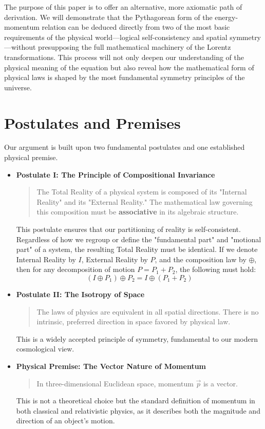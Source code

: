 \documentclass[12pt, a4paper]{article}
\begin{document}
The purpose of this paper is to offer an alternative, more axiomatic path of derivation. We will demonstrate that the Pythagorean form of the energy-momentum relation can be deduced directly from two of the most basic requirements of the physical world—logical self-consistency and spatial symmetry—without presupposing the full mathematical machinery of the Lorentz transformations. This process will not only deepen our understanding of the physical meaning of the equation but also reveal how the mathematical form of physical laws is shaped by the most fundamental symmetry principles of the universe.

\section{Postulates and Premises}

Our argument is built upon two fundamental postulates and one established physical premise.

\begin{itemize}
    \item \textbf{Postulate I: The Principle of Compositional Invariance}
    \begin{quote}
    The Total Reality of a physical system is composed of its "Internal Reality" and its "External Reality." The mathematical law governing this composition must be \textbf{associative} in its algebraic structure.
    \end{quote}
    This postulate ensures that our partitioning of reality is self-consistent. Regardless of how we regroup or define the "fundamental part" and "motional part" of a system, the resulting Total Reality must be identical. If we denote Internal Reality by $I$, External Reality by $P$, and the composition law by $\oplus$, then for any decomposition of motion $P = P_1 + P_2$, the following must hold:
    \begin{equation}
        (I \oplus P_1) \oplus P_2 = I \oplus (P_1 + P_2)
        \label{eq:assoc}
    \end{equation}

    \item \textbf{Postulate II: The Isotropy of Space}
    \begin{quote}
    The laws of physics are equivalent in all spatial directions. There is no intrinsic, preferred direction in space favored by physical law.
    \end{quote}
    This is a widely accepted principle of symmetry, fundamental to our modern cosmological view.

    \item \textbf{Physical Premise: The Vector Nature of Momentum}
    \begin{quote}
    In three-dimensional Euclidean space, momentum $\vec{p}$ is a vector.
    \end{quote}
    This is not a theoretical choice but the standard definition of momentum in both classical and relativistic physics, as it describes both the magnitude and direction of an object's motion.
\end{itemize}
\end{document}
